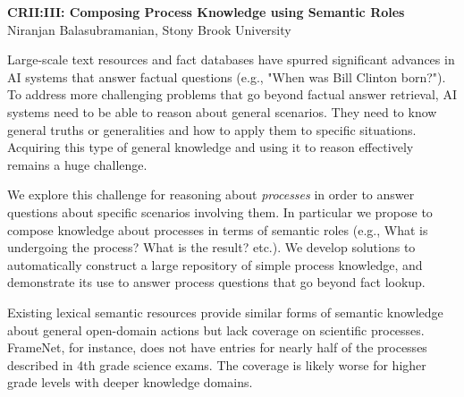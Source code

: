 \begin{center} 
	{\bf CRII:III: Composing Process Knowledge using Semantic Roles}\\
	{Niranjan Balasubramanian, Stony Brook University}

 \end{center}

Large-scale text resources and fact databases have spurred significant advances 
in AI systems that answer factual questions  (e.g., "When was Bill Clinton born?").
To address more challenging problems that go beyond factual answer retrieval,
AI systems need to be able to reason about general scenarios. 
They need to know general truths or generalities and how to apply them to specific situations. 
Acquiring this type of general knowledge and using it to reason effectively remains a huge challenge.

We explore this challenge for reasoning about {\em processes} in order to answer
questions about specific scenarios involving them. 
In particular we propose to compose knowledge about processes in terms of semantic roles (e.g., What is undergoing the process? What is the result? etc.). We develop solutions to automatically construct a large repository of simple process knowledge, and demonstrate its use to answer process questions that go beyond fact lookup. 

Existing lexical semantic resources provide similar forms of semantic knowledge about general open-domain actions but lack coverage on scientific processes. FrameNet, for instance, does not have entries for nearly half of the processes described in 4th grade science exams. The coverage is likely worse for higher grade levels with deeper knowledge domains. 

